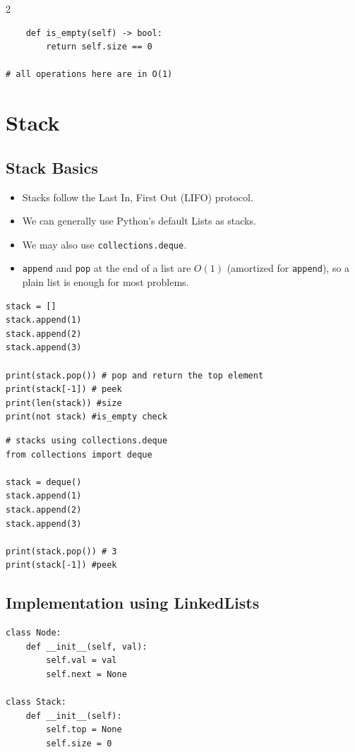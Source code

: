 \documentclass[9pt,a4paper]{extarticle}
\begin{document}
\begin{multicols}{2}
\begin{lstlisting}
    def is_empty(self) -> bool:
        return self.size == 0

# all operations here are in O(1)
\end{lstlisting}

\section{Stack}

\subsection{Stack Basics}

\begin{itemize}
\item Stacks follow the Last In, First Out (LIFO) protocol.
\item We can generally use Python's default Lists as stacks.
\item We may also use \texttt{collections.\allowbreak{}deque}.
\item \texttt{append} and \texttt{pop} at the end of a list are $O(1)$ (amortized for \texttt{append}), so a plain list is enough for most problems.
\end{itemize}

\begin{lstlisting}
stack = []
stack.append(1)
stack.append(2)
stack.append(3)

print(stack.pop()) # pop and return the top element
print(stack[-1]) # peek
print(len(stack)) #size
print(not stack) #is_empty check
\end{lstlisting}

\begin{lstlisting}
# stacks using collections.deque
from collections import deque

stack = deque()
stack.append(1)
stack.append(2)
stack.append(3)

print(stack.pop()) # 3
print(stack[-1]) #peek
\end{lstlisting}

\subsection{Implementation using LinkedLists}

\begin{lstlisting}
class Node:
    def __init__(self, val):
        self.val = val
        self.next = None

class Stack:
    def __init__(self):
        self.top = None
        self.size = 0


\end{lstlisting}
\end{multicols}
\end{document}
